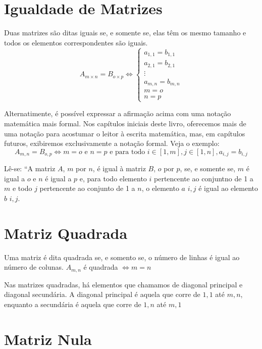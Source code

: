 \documentclass[
  letterpaper,
  DIV=11,
  numbers=noendperiod]{scrreprt}
\begin{document}
\section{Igualdade de Matrizes}\label{igualdade-de-matrizes}

Duas matrizes são ditas iguais se, e somente se, elas têm os mesmo
tamanho e todos os elementos correspondentes são iguais. \[
A_{m\times n} = B_{o\times p} \Leftrightarrow
\begin{cases}
    a_{1,1} = b_{1,1} \\
    a_{2,1} = b_{2,1} \\
    \vdots  \\
    a_{m,n} = b_{m,n}\\
    m = o \\
    n = p
\end{cases}
\]

Alternatimente, é possível expressar a afirmação acima com uma notação
matemática mais formal. Nos capítulos iniciais deste livro, oferecemos
mais de uma notação para acostumar o leitor à escrita matemática, mas,
em capítulos futuros, exibiremos exclusivamente a notação formal. Veja o
exemplo: \[
A_{m,n} = B_{o,p} \Leftrightarrow m=o \text{ e }  n=p \text{ e para todo }  i \in [1,m], j \in [1,n],  a_{i,j} = b_{i,j}
\]

Lê-se: ``A matriz \(A\), \(m\) por \(n\), é igual à matriz \(B\), \(o\)
por \(p\), se, e somente se, \(m\) é igual a \(o\) e \(n\) é igual a
\(p\) e, para todo elemento \(i\) pertencente ao conjuntno de 1 a \(m\)
e todo \(j\) pertencente ao conjunto de 1 a \(n\), o elemento \(a\)
\(i,j\) é igual ao elemento \(b\) \(i,j\).

\section{Matriz Quadrada}\label{matriz-quadrada}

Uma matriz é dita quadrada se, e somento se, o número de linhas é igual
ao número de colunas. \(A_{m,n}\) é quadrada \(\Leftrightarrow m=n\)

Nas matrizes quadradas, há elementos que chamamos de diagonal principal
e diagonal secundária. A diagonal principal é aquela que corre de
\(1,1\) até \(m,n\), enquanto a secundária é aquela que corre de \(1,n\)
até \(m,1\)

\section{Matriz Nula}\label{matriz-nula}
\end{document}
